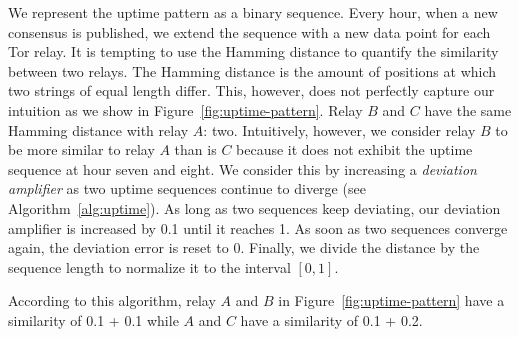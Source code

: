 We represent the uptime pattern as a binary sequence.  Every hour, when a new
consensus is published, we extend the sequence with a new data point for each
Tor relay.  It is tempting to use the Hamming distance to quantify the
similarity between two relays.  The Hamming distance is the amount of positions
at which two strings of equal length differ.  This, however, does not perfectly
capture our intuition as we show in Figure~\ref{fig:uptime-pattern}.  Relay $B$
and $C$ have the same Hamming distance with relay $A$: two.  Intuitively,
however, we consider relay $B$ to be more similar to relay $A$ than is $C$
because it does not exhibit the uptime sequence at hour seven and eight.  We
consider this by increasing a \emph{deviation amplifier} as two uptime sequences
continue to diverge (see Algorithm~\ref{alg:uptime}).  As long as two sequences
keep deviating, our deviation amplifier is increased by 0.1 until it reaches 1.  As
soon as two sequences converge again, the deviation error is reset to 0.
Finally, we divide the distance by the sequence length to normalize it to the
interval $[0, 1]$.

According to this algorithm, relay $A$ and $B$ in
Figure~\ref{fig:uptime-pattern} have a similarity of 0.1 + 0.1 while $A$ and
$C$ have a similarity of 0.1 + 0.2.

